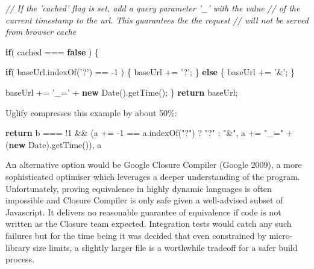 \documentclass[12pt, ]{article}
\newenvironment{Shaded}{}{}
\newcommand{\KeywordTok}[1]{\textcolor[rgb]{0.00,0.44,0.13}{\textbf{{#1}}}}
\newcommand{\DecValTok}[1]{\textcolor[rgb]{0.25,0.63,0.44}{{#1}}}
\newcommand{\StringTok}[1]{\textcolor[rgb]{0.25,0.44,0.63}{{#1}}}
\newcommand{\CommentTok}[1]{\textcolor[rgb]{0.38,0.63,0.69}{\textit{{#1}}}}
\newcommand{\OtherTok}[1]{\textcolor[rgb]{0.00,0.44,0.13}{{#1}}}
\newcommand{\FunctionTok}[1]{\textcolor[rgb]{0.02,0.16,0.49}{{#1}}}
\newcommand{\NormalTok}[1]{{#1}}
\begin{document}
\begin{Shaded}
\begin{Highlighting}[]
\CommentTok{// If the 'cached' flag is set, add a query parameter '_' with the value }
\CommentTok{// of the current timestamp to the url. This guarantees the the request }
\CommentTok{// will not be served from browser cache}

\KeywordTok{if}\NormalTok{( cached === }\KeywordTok{false} \NormalTok{) \{}
           
   \KeywordTok{if}\NormalTok{( }\OtherTok{baseUrl}\NormalTok{.}\FunctionTok{indexOf}\NormalTok{(}\StringTok{'?'}\NormalTok{) == -}\DecValTok{1} \NormalTok{) \{}
      \NormalTok{baseUrl += }\StringTok{'?'}\NormalTok{;}
   \NormalTok{\} }\KeywordTok{else} \NormalTok{\{}
      \NormalTok{baseUrl += }\StringTok{'&'}\NormalTok{;}
   \NormalTok{\}}
   
   \NormalTok{baseUrl += }\StringTok{'_='} \NormalTok{+ }\KeywordTok{new} \FunctionTok{Date}\NormalTok{().}\FunctionTok{getTime}\NormalTok{();}
\NormalTok{\}}
\KeywordTok{return} \NormalTok{baseUrl;}
\end{Highlighting}
\end{Shaded}

Uglify compresses this example by about 50\%:

\begin{Shaded}
\begin{Highlighting}[]
\KeywordTok{return} \NormalTok{b === !}\DecValTok{1} \NormalTok{&& (a += -}\DecValTok{1} \NormalTok{== }\OtherTok{a}\NormalTok{.}\FunctionTok{indexOf}\NormalTok{(}\StringTok{"?"}\NormalTok{) ? }
\StringTok{"?"} \NormalTok{: }\StringTok{"&"}\NormalTok{, a += }\StringTok{"_="} \NormalTok{+ (}\KeywordTok{new} \NormalTok{Date).}\FunctionTok{getTime}\NormalTok{()), a}
\end{Highlighting}
\end{Shaded}

An alternative option would be Google Closure Compiler (Google 2009), a
more sophisticated optimiser which leverages a deeper understanding of
the program. Unfortunately, proving equivalence in highly dynamic
languages is often impossible and Closure Compiler is only safe given a
well-advised subset of Javascript. It delivers no reasonable guarantee
of equivalence if code is not written as the Closure team expected.
Integration tests would catch any such failures but for the time being
it was decided that even constrained by micro-library size limits, a
slightly larger file is a worthwhile tradeoff for a safer build process.
\end{document}
